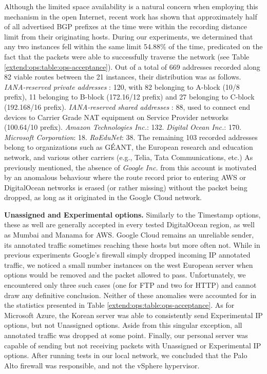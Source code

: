 Although the limited space availability is a natural concern when employing this mechanism in the open Internet, recent work \cite{goodchild2017record} has shown that approximately half of all advertised BGP prefixes at the time were within the recording distance limit from their originating hosts. During our experiments, we determined that any two instances fell within the same limit 54.88\% of the time, predicated on the fact that the packets were able to successfully traverse the network (see Table \ref{extend:ops:table:ops-acceptance}). Out of a total of 669 addresses recorded along 82 viable routes between the 21 instances, their distribution was as follows. \textit{IANA-reserved private addresses} \cite{rekhter1996rfc1918}: 120, with 82 belonging to A-block (10/8 prefix), 11 belonging to B-block (172.16/12 prefix) and 27 belonging to C-block (192.168/16 prefix). \textit{IANA-reserved shared addresses} \cite{rfc6598}: 88, used to connect end devices to Carrier Grade NAT equipment on Service Provider networks (100.64/10 prefix). \textit{Amazon Technologies Inc.}: 132. \textit{Digital Ocean Inc.}: 170. \textit{Microsoft Corporation}: 18. \textit{RoEduNet}: 38. The remaining 103 recorded addresses belong to organizations such as GÉANT, the European research and education network, and various other carriers (e.g., Telia, Tata Communications, etc.) As previously mentioned, the absence of \textit{Google Inc.} from this account is motivated by an anomalous behaviour where the route record prior to entering AWS or DigitalOcean networks is erased (or rather missing) without the packet being dropped, as long as it originated in the Google Cloud network.

\textbf{Unassigned and Experimental options.} Similarly to the Timestamp options, these as well are generally accepted in every tested DigitalOcean region, as well as Mumbai and Manama for AWS. Google Cloud remains an unreliable sender, its annotated traffic sometimes reaching these hosts but more often not. While in previous experiments Google's firewall simply dropped incoming IP annotated traffic, we noticed a small number instances on the west European server when options would be removed and the packet allowed to pass. Unfortunately, we encountered only three such cases (one for FTP and two for HTTP) and cannot draw any definitive conclusion. Neither of these anomalies were accounted for in the statistics presented in Table \ref{extend:ops:table:ops-acceptance}. As for Microsoft Azure, the Korean server was able to consistently send Experimental IP options, but not Unassigned options. Aside from this singular exception, all annotated traffic was dropped at some point. Finally, our personal server was capable of sending but not receiving packets with Unassigned or Experimental IP options. After running tests in our local network, we concluded that the Palo Alto firewall was responsible, and not the vSphere hypervisor.



